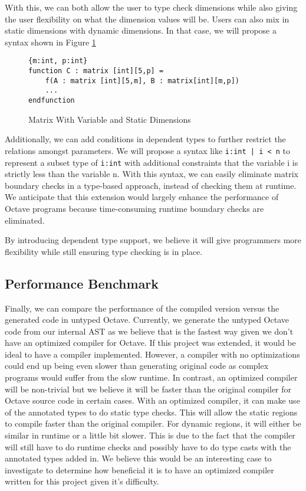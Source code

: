 With this, we can both allow the user to type check dimensions while also giving the user flexibility on what the dimension values will be. Users can also mix in static dimensions with dynamic dimensions. In that case, we will propose a syntax shown in Figure \ref{fig:variableAndStaticDimensions}

\begin{figure}[h]
    \begin{lstlisting}[language=racket]
{m:int, p:int}
function C : matrix [int][5,p] = 
    f(A : matrix [int][5,m], B : matrix[int][m,p])
	...
endfunction
    \end{lstlisting}
    \caption[]{{Matrix With Variable and Static Dimensions}}
    \label{fig:variableAndStaticDimensions}
\end{figure}

Additionally, we can add conditions in dependent types to further restrict the relations amongst parameters. We will propose a syntax like {\tt i:int | i < n} to represent a subset type of {\tt i:int} with additional constraints that the variable i is strictly less than the variable n. With this syntax, we can easily eliminate matrix boundary checks in a type-based approach, instead of checking them at runtime. We anticipate that this extension would largely enhance the performance of Octave programs because time-consuming runtime boundary checks are eliminated.

By introducing dependent type support, we believe it will give programmers more flexibility while still ensuring type checking is in place. 

\subsection{Performance Benchmark}
Finally, we can compare the performance of the compiled version versus the generated code in untyped Octave. Currently, we generate the untyped Octave code from our internal AST as we believe that is the fastest way given we don't have an optimized compiler for Octave. If this project was extended, it would be ideal to have a compiler implemented. However, a compiler with no optimizations could end up being even slower than generating original code as complex programs would suffer from the slow runtime. In contrast, an optimized compiler will be non-trivial but we believe it will be faster than the original compiler for Octave source code in certain cases. With an optimized compiler, it can make use of the annotated types to do static type checks. This will allow the static regions to compile faster than the original compiler. For dynamic regions, it will either be similar in runtime or a little bit slower. This is due to the fact that the compiler will still have to do runtime checks and possibly have to do type casts with the annotated types added in. We believe this would be an interesting case to investigate to determine how beneficial it is to have an optimized compiler written for this project given it's difficulty. 

